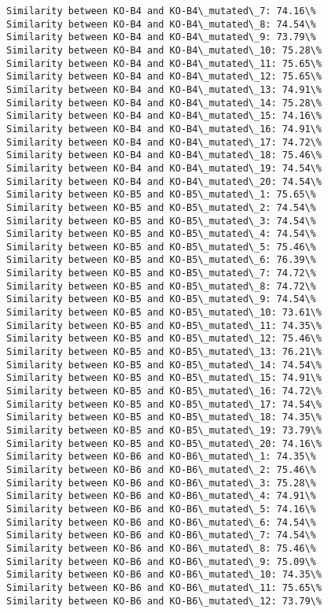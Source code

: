 \documentclass[11pt]{article}
\begin{document}
\begin{Verbatim}[commandchars=\\\{\}]
Similarity between KO-B4 and KO-B4\_mutated\_7: 74.16\%
Similarity between KO-B4 and KO-B4\_mutated\_8: 74.54\%
Similarity between KO-B4 and KO-B4\_mutated\_9: 73.79\%
Similarity between KO-B4 and KO-B4\_mutated\_10: 75.28\%
Similarity between KO-B4 and KO-B4\_mutated\_11: 75.65\%
Similarity between KO-B4 and KO-B4\_mutated\_12: 75.65\%
Similarity between KO-B4 and KO-B4\_mutated\_13: 74.91\%
Similarity between KO-B4 and KO-B4\_mutated\_14: 75.28\%
Similarity between KO-B4 and KO-B4\_mutated\_15: 74.16\%
Similarity between KO-B4 and KO-B4\_mutated\_16: 74.91\%
Similarity between KO-B4 and KO-B4\_mutated\_17: 74.72\%
Similarity between KO-B4 and KO-B4\_mutated\_18: 75.46\%
Similarity between KO-B4 and KO-B4\_mutated\_19: 74.54\%
Similarity between KO-B4 and KO-B4\_mutated\_20: 74.54\%
Similarity between KO-B5 and KO-B5\_mutated\_1: 75.65\%
Similarity between KO-B5 and KO-B5\_mutated\_2: 74.54\%
Similarity between KO-B5 and KO-B5\_mutated\_3: 74.54\%
Similarity between KO-B5 and KO-B5\_mutated\_4: 74.54\%
Similarity between KO-B5 and KO-B5\_mutated\_5: 75.46\%
Similarity between KO-B5 and KO-B5\_mutated\_6: 76.39\%
Similarity between KO-B5 and KO-B5\_mutated\_7: 74.72\%
Similarity between KO-B5 and KO-B5\_mutated\_8: 74.72\%
Similarity between KO-B5 and KO-B5\_mutated\_9: 74.54\%
Similarity between KO-B5 and KO-B5\_mutated\_10: 73.61\%
Similarity between KO-B5 and KO-B5\_mutated\_11: 74.35\%
Similarity between KO-B5 and KO-B5\_mutated\_12: 75.46\%
Similarity between KO-B5 and KO-B5\_mutated\_13: 76.21\%
Similarity between KO-B5 and KO-B5\_mutated\_14: 74.54\%
Similarity between KO-B5 and KO-B5\_mutated\_15: 74.91\%
Similarity between KO-B5 and KO-B5\_mutated\_16: 74.72\%
Similarity between KO-B5 and KO-B5\_mutated\_17: 74.54\%
Similarity between KO-B5 and KO-B5\_mutated\_18: 74.35\%
Similarity between KO-B5 and KO-B5\_mutated\_19: 73.79\%
Similarity between KO-B5 and KO-B5\_mutated\_20: 74.16\%
Similarity between KO-B6 and KO-B6\_mutated\_1: 74.35\%
Similarity between KO-B6 and KO-B6\_mutated\_2: 75.46\%
Similarity between KO-B6 and KO-B6\_mutated\_3: 75.28\%
Similarity between KO-B6 and KO-B6\_mutated\_4: 74.91\%
Similarity between KO-B6 and KO-B6\_mutated\_5: 74.16\%
Similarity between KO-B6 and KO-B6\_mutated\_6: 74.54\%
Similarity between KO-B6 and KO-B6\_mutated\_7: 74.54\%
Similarity between KO-B6 and KO-B6\_mutated\_8: 75.46\%
Similarity between KO-B6 and KO-B6\_mutated\_9: 75.09\%
Similarity between KO-B6 and KO-B6\_mutated\_10: 74.35\%
Similarity between KO-B6 and KO-B6\_mutated\_11: 75.65\%
Similarity between KO-B6 and KO-B6\_mutated\_12: 73.79\%

\end{Verbatim}
\end{document}
